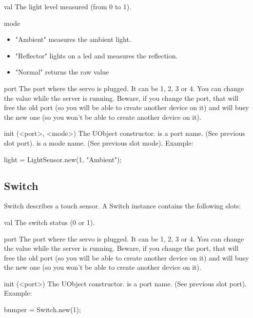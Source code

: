 \begin{urbiscriptapi}
\item[val] The light level measured (from 0 to 1).

\item[mode]
  \begin{itemize}
  \item "Ambient" measures the ambient light.
  \item "Reflector" lights on a led and measures the reflection.
  \item "Normal" returns the raw value
  \end{itemize}

\item[port] The port where the servo is plugged. It can be 1, 2, 3 or 4. You
  can change the value while the server is running. Beware, if you change
  the port, that will free the old port (so you will be able to create
  another device on it) and will busy the new one (so you won't be able to
  create another device on it).

\item[init](<port>, <mode>) The UObject constructor.  is a port
  name. (See previous slot port).  is a mode name. (See previous
  slot mode). Example:
\begin{urbiunchecked}
  light = LightSensor.new(1, "Ambient");
\end{urbiunchecked}
\end{urbiscriptapi}

\subsection{Switch}

Switch describes a touch sensor. A Switch instance contains the following
slots:

\begin{urbiscriptapi}
\item[val] The switch status (0 or 1).

\item[port] The port where the servo is plugged. It can be 1, 2, 3 or 4. You
  can change the value while the server is running. Beware, if you change
  the port, that will free the old port (so you will be able to create
  another device on it) and will busy the new one (so you won't be able to
  create another device on it).

\item[init](<port>) The UObject constructor.  is a port name. (See
  previous slot port). Example:
\begin{urbiunchecked}
  bumper = Switch.new(1);
\end{urbiunchecked}

\end{urbiscriptapi}

